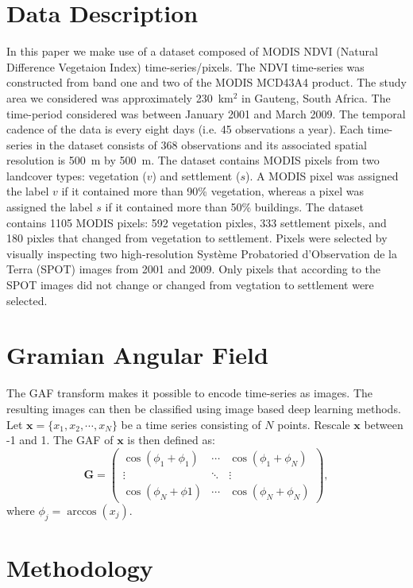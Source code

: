 \documentclass{article}
\begin{document}
\section{Data Description}
\label{sec:data}
In this paper we make use of a dataset composed of MODIS NDVI (Natural Difference Vegetaion Index) time-series/pixels. The NDVI time-series was constructed from band one and two of the MODIS MCD43A4 product. The study area we considered was approximately 230~km$^2$ in Gauteng, South Africa. The time-period considered was between January 2001 and March 2009. The temporal cadence of the data is every eight days (i.e. 45 observations a year). Each time-series in the dataset consists of 368 observations and its associated spatial resolution is 500~m by 500~m. The dataset contains MODIS pixels from two landcover types: vegetation ($v$) and settlement ($s$). A MODIS pixel was assigned the label $v$ if it contained more than 90\% vegetation, whereas a pixel was assigned the label $s$ if it contained more than 50\% buildings. The dataset contains 1105 MODIS pixels: 592 vegetation pixles, 333 settlement pixels, and 180 pixles that changed from vegetation to settlement. Pixels were selected by visually inspecting two high-resolution Syst\`{e}me Probatoried d'Observation de la Terra (SPOT) images from 2001 and 2009. Only pixels that according to the SPOT images did not change or changed from vegtation to settlement were selected.

\section{Gramian Angular Field}
\label{sec:GAF}
The GAF transform makes it possible to encode time-series as images. The resulting images can then be classified using image based deep learning methods. Let $\mathbf{x} = \{x_1,x_2,\cdots,x_N\}$ be a time series consisting of $N$ points. Rescale $\mathbf{x}$ between -1 and 1. The GAF of $\mathbf{x}$ is then defined as: 
\begin{equation}
\mathbf{G} = \begin{pmatrix}
\cos(\phi_1+\phi_1) & \cdots & \cos(\phi_1+\phi_N)\\
\vdots& \ddots &\vdots\\
\cos(\phi_N+\phi1)&\cdots&\cos(\phi_N+\phi_N)
\end{pmatrix},\nonumber
\end{equation}
where $\phi_j = \arccos(x_j)$.
  
\section{Methodology}
\label{sec:exp}
\end{document}
